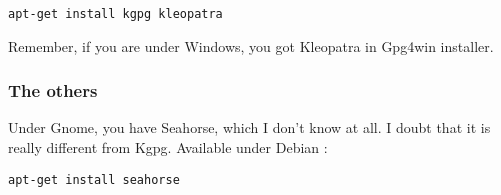 \begin{verbatim}
apt-get install kgpg kleopatra
\end{verbatim}

Remember, if you are under Windows, you got Kleopatra in Gpg4win
installer.

\subsubsection{The others}\label{the-others-1}

Under Gnome, you have Seahorse, which I don't know at all. I doubt that
it is really different from Kgpg. Available under Debian :

\begin{verbatim}
apt-get install seahorse
\end{verbatim}